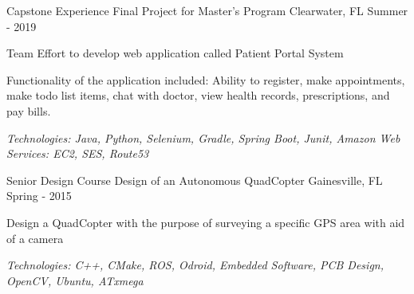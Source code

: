 

\begin{cventries}

	\cventry
		{Capstone Experience} %
		{Final Project for Master's Program} %
		{Clearwater, FL} %
		{Summer - 2019} %
		{
			\begin{cvitems} %
			\item {Team Effort to develop web application called Patient Portal System}
			\item {Functionality of the application included: Ability to register, make appointments, make todo list items, chat with doctor, view health records, prescriptions, and pay bills.}
			\item {\it{Technologies:} Java, Python, Selenium, Gradle, Spring Boot, Junit, Amazon Web Services: EC2, SES, Route53}
			\end{cvitems}
		}

  \cventry
    {Senior Design Course} %
    {Design of an Autonomous QuadCopter} %
    {Gainesville, FL} %
    {Spring - 2015} %
    {
      \begin{cvitems} %
				\item {Design a QuadCopter with the purpose of surveying a specific GPS area with aid of a camera}
				\item {\it{Technologies:} C++, CMake, ROS, Odroid, Embedded Software, PCB Design, OpenCV, Ubuntu, ATxmega}
      \end{cvitems}
    }


\end{cventries}
